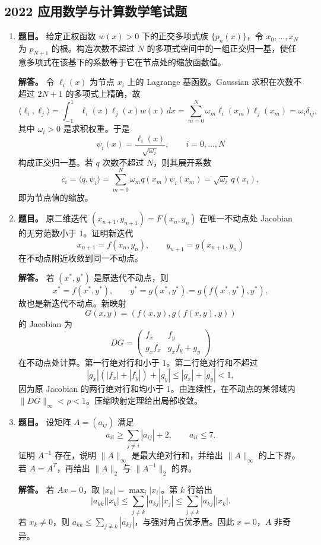 ﻿\documentclass[UTF8,12pt]{ctexart}
\begin{document}
\subsection{2022 应用数学与计算数学笔试题}
\begin{enumerate}[label=\textbf{\arabic*.},leftmargin=2.2em]
\item \textbf{题目。} 给定正权函数 \(w(x)>0\) 下的正交多项式族 \(\{p_n(x)\}\)，令 \(x_0,\ldots,x_N\) 为 \(p_{N+1}\) 的根。构造次数不超过 \(N\) 的多项式空间中的一组正交归一基，使任意多项式在该基下的系数等于它在节点处的缩放函数值。

\textbf{解答。} 令 \(\ell_i(x)\) 为节点 \(x_i\) 上的 Lagrange 基函数。Gaussian 求积在次数不超过 \(2N+1\) 的多项式上精确，故
\[
\langle \ell_i,\ell_j\rangle
=\int_{-1}^1\ell_i(x)\ell_j(x)w(x)\,dx
=\sum_{m=0}^N \omega_m\ell_i(x_m)\ell_j(x_m)
=\omega_i\delta_{ij},
\]
其中 \(\omega_i>0\) 是求积权重。于是
\[
\psi_i(x)=\frac{\ell_i(x)}{\sqrt{\omega_i}},\qquad i=0,\ldots,N
\]
构成正交归一基。若 \(q\) 次数不超过 \(N\)，则其展开系数
\[
c_i=\langle q,\psi_i\rangle
=\sum_{m=0}^N\omega_m q(x_m)\psi_i(x_m)
=\sqrt{\omega_i}\,q(x_i),
\]
即为节点值的缩放。

\item \textbf{题目。} 原二维迭代 \((x_{n+1},y_{n+1})=F(x_n,y_n)\) 在唯一不动点处 Jacobian 的无穷范数小于 \(1\)。证明新迭代
\[
x_{n+1}=f(x_n,y_n),\qquad y_{n+1}=g(x_{n+1},y_n)
\]
在不动点附近收敛到同一不动点。

\textbf{解答。} 若 \((x^\ast,y^\ast)\) 是原迭代不动点，则
\[
x^\ast=f(x^\ast,y^\ast),\qquad
y^\ast=g(x^\ast,y^\ast)=g(f(x^\ast,y^\ast),y^\ast),
\]
故也是新迭代不动点。新映射
\[
G(x,y)=(f(x,y),g(f(x,y),y))
\]
的 Jacobian 为
\[
DG=
\begin{pmatrix}
f_x&f_y\\
g_x f_x&g_x f_y+g_y
\end{pmatrix}
\]
在不动点处计算。第一行绝对行和小于 \(1\)。第二行绝对行和不超过
\[
|g_x|(|f_x|+|f_y|)+|g_y|
\le |g_x|+|g_y|<1,
\]
因为原 Jacobian 的两行绝对行和均小于 \(1\)。由连续性，在不动点的某邻域内 \(\|DG\|_\infty<\rho<1\)。压缩映射定理给出局部收敛。

\item \textbf{题目。} 设矩阵 \(A=(a_{ij})\) 满足
\[
a_{ii}\ge \sum_{j\ne i}|a_{ij}|+2,\qquad a_{ii}\le7.
\]
证明 \(A^{-1}\) 存在，说明 \(\|A\|_\infty\) 是最大绝对行和，并给出 \(\|A\|_\infty\) 的上下界。若 \(A=A^T\)，再给出 \(\|A\|_2\) 与 \(\|A^{-1}\|_2\) 的界。

\textbf{解答。} 若 \(Ax=0\)，取 \(|x_k|=\max_i|x_i|\)。第 \(k\) 行给出
\[
|a_{kk}||x_k|
\le\sum_{j\ne k}|a_{kj}||x_j|
\le\sum_{j\ne k}|a_{kj}||x_k|.
\]
若 \(x_k\ne0\)，则 \(a_{kk}\le\sum_{j\ne k}|a_{kj}|\)，与强对角占优矛盾。因此 \(x=0\)，\(A\) 非奇异。


\end{enumerate}
\end{document}
